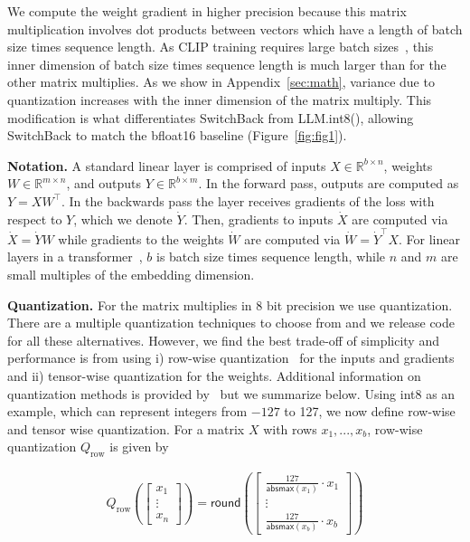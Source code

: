 We compute the weight gradient in higher precision because this matrix multiplication involves dot products between vectors which have a length of batch size times sequence length. As CLIP training requires large batch sizes~\cite{radford2021learning,pham2021scaling}, this inner dimension of batch size times sequence length is much larger than for the other matrix multiplies. As we show in Appendix~\ref{sec:math}, variance due to quantization increases with the inner dimension of the matrix multiply. This modification is what differentiates SwitchBack from LLM.int8(), allowing SwitchBack to match the bfloat16 baseline (Figure~\ref{fig:fig1}).

\textbf{Notation.} A standard linear layer is comprised of inputs $X \in \mathbb{R}^{b \times n}$, weights $W \in \mathbb{R}^{m \times n}$, and outputs $Y \in \mathbb{R}^{b \times m}$. In the forward pass, outputs are computed as $Y = XW^\top$.
In the backwards pass the layer receives gradients of the loss with respect to $Y$, which we denote $\dot Y$. Then, gradients to inputs $\dot X$ are computed via $\dot X = \dot Y W$ while gradients to the weights $\dot W$ are computed via $\dot W = \dot Y^\top X$. For linear layers in a transformer~\cite{vaswani2017attention}, $b$ is batch size times sequence length, while $n$ and $m$ are small multiples of the embedding dimension.

\textbf{Quantization.} For the matrix multiplies in 8 bit precision we use quantization. There are a multiple quantization techniques to choose from and we release code for all these alternatives. However, we find the best trade-off of simplicity and performance is from using i) row-wise quantization~\citep{fbgemm} for the inputs and gradients and ii) tensor-wise quantization for the weights. Additional information on quantization methods is provided by~\citet{dettmers2022llm} but we summarize below. Using int8 as an example, which can represent integers from $-127$ to 127, we now define row-wise and tensor wise quantization. For a matrix $X$ with rows $x_1, ..., x_b$, row-wise quantization $Q_\text{row}$ is given by

\begin{align}
Q_{\text{row}}\left( \begin{bmatrix}
   x_1  \\
  \vdots \\
   x_n 
\end{bmatrix} \right)
= 
\mathsf{round}\left(
\begin{bmatrix}
     \frac{127}{ \mathsf{absmax}\left(x_1\right)} \cdot x_1   \\
  \vdots \\
   \frac{127}{ \mathsf{absmax}\left(x_b\right)} \cdot x_b
\end{bmatrix}
\right)
\end{align}

